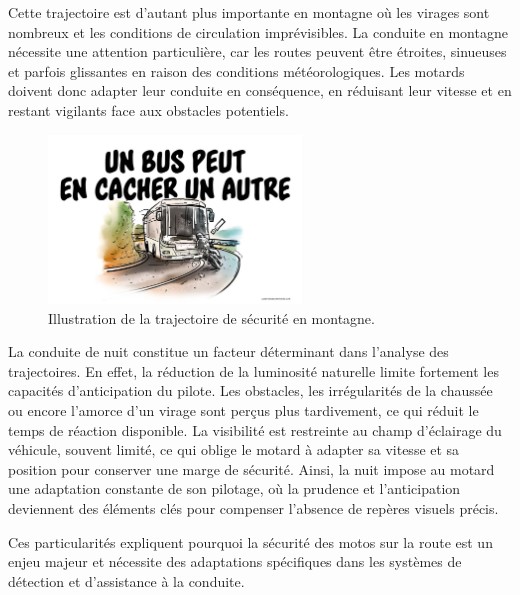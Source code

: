 Cette trajectoire est d'autant plus importante en montagne où les virages sont nombreux et les conditions de circulation imprévisibles. La conduite en montagne nécessite une attention particulière, car les routes peuvent être étroites, sinueuses et parfois glissantes en raison des conditions météorologiques. Les motards doivent donc adapter leur conduite en conséquence, en réduisant leur vitesse et en restant vigilants face aux obstacles potentiels.
\begin{figure}[H]
    \centering
    \includegraphics[width=0.6\textwidth]{etat_art/images/trajectoire-route-voie-bus-conduite_hd.jpg} 
    \caption{Illustration de la trajectoire de sécurité en montagne.}
\end{figure}
La conduite de nuit constitue un facteur déterminant dans l’analyse des trajectoires. En effet, la réduction de la luminosité naturelle limite fortement les capacités d’anticipation du pilote. Les obstacles, les irrégularités de la chaussée ou encore l’amorce d’un virage sont perçus plus tardivement, ce qui réduit le temps de réaction disponible. La visibilité est restreinte au champ d’éclairage du véhicule, souvent limité, ce qui oblige le motard à adapter sa vitesse et sa position pour conserver une marge de sécurité. 
Ainsi, la nuit impose au motard une adaptation constante de son pilotage, où la prudence et l’anticipation deviennent des éléments clés pour compenser l’absence de repères visuels précis.\\
\vspace{0.5cm}

Ces particularités expliquent pourquoi la sécurité des motos sur la route est un enjeu majeur et nécessite des adaptations spécifiques dans les systèmes de détection et d’assistance à la conduite. 

